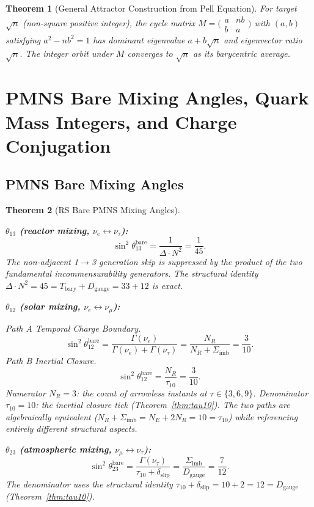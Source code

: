 \documentclass[11pt, letterpaper]{article}
\newcommand{\Tbary}{T_{\mathrm{bary}}}
\newcommand{\Tcharge}{\Gamma}
\newcommand{\Dg}{D_{\mathrm{gauge}}}
\newcommand{\Sigimb}{\Sigma_{\mathrm{imb}}}
\theoremstyle{definition}
\theoremstyle{plain}
\newtheorem{theorem}{Theorem}[section]
\begin{document}
\begin{theorem}[General Attractor Construction from Pell Equation]
\label{thm:pell}
For target $\sqrt{n}$ (non-square positive integer), the cycle matrix
$M=\bigl(\begin{smallmatrix}a&nb\\b&a\end{smallmatrix}\bigr)$
with $(a,b)$ satisfying $a^2-nb^2=1$ has dominant eigenvalue $a+b\sqrt{n}$
and eigenvector ratio $\sqrt{n}$.  The integer orbit under $M$ converges to
$\sqrt{n}$ as its barycentric average.
\end{theorem}

\newpage


\section{PMNS Bare Mixing Angles, Quark Mass Integers, and Charge Conjugation}
\label{sec:pmns-quarks}

\subsection{PMNS Bare Mixing Angles}

\begin{theorem}[RS Bare PMNS Mixing Angles]\label{thm:pmns}
\begin{rsbox}
\textbf{$\theta_{13}$ (reactor mixing, $\nu_e\leftrightarrow\nu_\tau$):}
\[
\sin^2\theta_{13}^{\mathrm{bare}}
= \frac{1}{\Delta\cdot N^2} = \frac{1}{45}.
\]
The non-adjacent 1$\to$3 generation skip is suppressed by the product of the
two fundamental incommensurability generators.  The structural identity
$\Delta\cdot N^2=45=\Tbary+\Dg=33+12$ is exact.

\medskip\noindent\textbf{$\theta_{12}$ (solar mixing, $\nu_e\leftrightarrow\nu_\mu$):}

\noindent\emph{Path A  Temporal Charge Boundary.}
\[
\sin^2\theta_{12}^{\mathrm{bare}}
= \frac{\Tcharge(\nu_e)}{\Tcharge(\nu_e)+\Tcharge(\nu_\tau)}
= \frac{N_R}{N_R+\Sigimb} = \frac{3}{10}.
\]
\noindent\emph{Path B  Inertial Closure.}
\[
\sin^2\theta_{12}^{\mathrm{bare}}
= \frac{N_R}{\tau_{10}} = \frac{3}{10}.
\]
Numerator $N_R=3$: the count of arrowless instants at $\tau\in\{3,6,9\}$.
Denominator $\tau_{10}=10$: the inertial closure tick
(Theorem~\ref{thm:tau10}).  The two paths are algebraically equivalent
($N_R+\Sigimb=N_E+2N_R=10=\tau_{10}$) while referencing entirely different
structural aspects.

\medskip\noindent\textbf{$\theta_{23}$ (atmospheric mixing,
$\nu_\mu\leftrightarrow\nu_\tau$):}
\[
\sin^2\theta_{23}^{\mathrm{bare}}
= \frac{\Tcharge(\nu_\tau)}{\tau_{10}+\delta_{\mathrm{slip}}}
= \frac{\Sigimb}{\Dg} = \frac{7}{12}.
\]
The denominator uses the structural identity
$\tau_{10}+\delta_{\mathrm{slip}}=10+2=12=\Dg$
(Theorem~\ref{thm:tau10}).
\end{rsbox}
\end{theorem}
\end{document}
